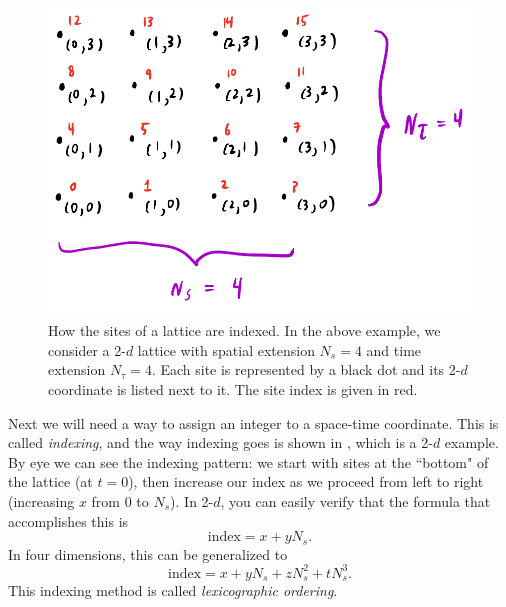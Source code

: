\begin{figure}
  \centering
  \includegraphics[width=\linewidth]{figs/indexing.pdf}
  \caption{How the sites of a lattice are indexed. In the above example, we
consider a 2-$d$ lattice with spatial extension $N_s=4$ and time extension
$N_\tau=4$. Each site is represented by a black dot and its 2-$d$ coordinate is
listed next to it. The site index is given in red.}
  \label{fig:index}
\end{figure}

Next we will need a way to assign an integer to a space-time coordinate. This is 
called {\it indexing}, and the way indexing goes is shown in ,
which is a 2-$d$ example. By eye we can see the indexing pattern: we start with
sites at the ``bottom" of the lattice (at $t=0$), then increase our index as we
proceed from left to right (increasing $x$ from 0 to $N_s$). 
In 2-$d$, you can easily verify that the formula that accomplishes this is
\begin{equation}\label{eq:lex2d}
  \text{index}=x+yN_s.
\end{equation}
In four dimensions, this can be generalized to
\begin{equation}\label{eq:lex4d}
  \text{index}=x+yN_s+zN_s^2+tN_s^3.
\end{equation}
This indexing method is called {\it lexicographic
ordering}. 

